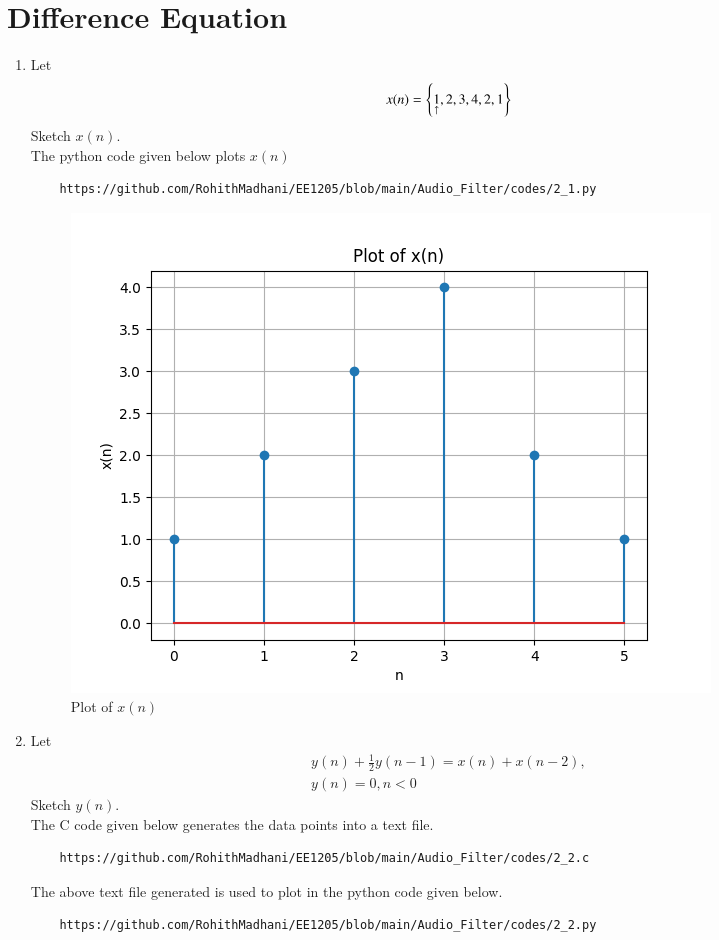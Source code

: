 \documentclass[journal,12pt,twocolumn]{IEEEtran}
\theoremstyle{remark}
\begin{document}
\section{Difference Equation}
\begin{enumerate}[label=\thesection.\arabic*,ref=\thesection.\theenumi]
    \item Let
    \begin{equation}
    x(n) = \left\{\underset{\uparrow}{1},2,3,4,2,1\right\}
    \end{equation}
    Sketch $x(n)$.\\
\solution The python code given below plots $x(n)$
\begin{lstlisting}
    https://github.com/RohithMadhani/EE1205/blob/main/Audio_Filter/codes/2_1.py
\end{lstlisting}
\begin{figure}[H]
    \includegraphics[width=0.8\columnwidth]{figs/2_1.png}
    \caption{Plot of $x(n)$}
    \label{fig:2.1_plot}
\end{figure}
\item Let
\begin{multline}
    \label{eq:iir_filter}
    y(n) + \frac{1}{2}y(n-1) = x(n) + x(n-2), 
    \\
     y(n) = 0, n < 0
    \end{multline}
    Sketch $y(n)$.\\
\solution The C code given below generates the data points into a text file.
\begin{lstlisting}
    https://github.com/RohithMadhani/EE1205/blob/main/Audio_Filter/codes/2_2.c
\end{lstlisting}
The above text file generated is used to plot in the python code given below.
\begin{lstlisting}
    https://github.com/RohithMadhani/EE1205/blob/main/Audio_Filter/codes/2_2.py

\end{lstlisting}
\end{enumerate}
\end{document}
